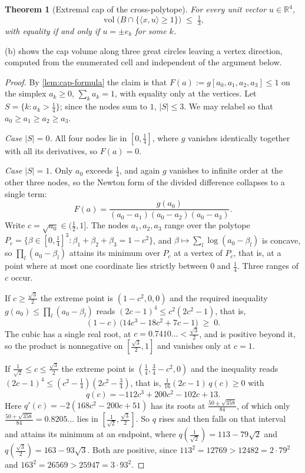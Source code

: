 \documentclass[11pt,reqno]{amsart}
\renewcommand{\_}{\origunderscore\allowbreak}
\numberwithin{equation}{section}
\theoremstyle{plain}
\newtheorem{thm}{Theorem}[section]
\theoremstyle{definition}
\theoremstyle{remark}
\DeclareMathOperator{\vol}{vol}
\begin{document}
\begin{thm}[Extremal cap of the cross-polytope]\label{thm:cap-inequality}
For every unit vector $u\in\mathbb{R}^4$,
\[
  \vol\bigl(B\cap\{\langle x,u\rangle\ge1\}\bigr)\;\le\;\tfrac13,
\]
with equality if and only if $u=\pm e_k$ for some $k$.
\end{thm}

(b) shows the cap volume along three great circles
leaving a vertex direction, computed from the enumerated cell and
independent of the argument below.

\begin{proof}
By \cref{lem:cap-formula} the claim is that $F(a):=g[a_0,a_1,a_2,a_3]\le1$
on the simplex $a_k\ge0$, $\sum_ka_k=1$, with equality only at the
vertices. Let $S=\{k:a_k>\tfrac14\}$; since the nodes sum to $1$,
$|S|\le3$. We may relabel so that $a_0\ge a_1\ge a_2\ge a_3$.

\emph{Case $|S|=0$.} All four nodes lie in $[0,\tfrac14]$, where $g$
vanishes identically together with all its derivatives, so $F(a)=0$.

\emph{Case $|S|=1$.} Only $a_0$ exceeds $\tfrac14$, and again $g$ vanishes
to infinite order at the other three nodes, so the Newton form of the
divided difference collapses to a single term:
\[
  F(a)=\frac{g(a_0)}{(a_0-a_1)(a_0-a_2)(a_0-a_3)} .
\]
Write $c=\sqrt{a_0}\in(\tfrac12,1]$. The nodes $a_1,a_2,a_3$ range over
the polytope $P_c=\{\beta\in[0,\tfrac14]^3:\beta_1+\beta_2+\beta_3=1-c^2\}$,
and $\beta\mapsto\sum_l\log(a_0-\beta_l)$ is concave, so
$\prod_l(a_0-\beta_l)$ attains its minimum over $P_c$ at a vertex of
$P_c$, that is, at a point where at most one coordinate lies strictly
between $0$ and $\tfrac14$. Three ranges of $c$ occur.

If $c\ge\tfrac{\sqrt3}{2}$ the extreme point is $(1-c^2,0,0)$ and the
required inequality $g(a_0)\le\prod_l(a_0-\beta_l)$ reads
$(2c-1)^4\le c^2(2c^2-1)$, that is,
\[
  (1-c)\,\bigl(14c^3-18c^2+7c-1\bigr)\;\ge\;0 .
\]
The cubic has a single real root, at $c=0.7410\ldots<\tfrac{\sqrt3}{2}$,
and is positive beyond it, so the product is nonnegative on
$[\tfrac{\sqrt3}{2},1]$ and vanishes only at $c=1$.

If $\tfrac{1}{\sqrt2}\le c\le\tfrac{\sqrt3}{2}$ the extreme point is
$(\tfrac14,\tfrac34-c^2,0)$ and the inequality reads
$(2c-1)^4\le(c^2-\tfrac14)(2c^2-\tfrac34)$, that is,
$\tfrac{1}{16}(2c-1)\,q(c)\ge0$ with
\[
  q(c)=-112c^3+200c^2-102c+13 .
\]
Here $q'(c)=-2(168c^2-200c+51)$ has its roots at
$\tfrac{50\pm\sqrt{358}}{84}$, of which only
$\tfrac{50+\sqrt{358}}{84}=0.8205\ldots$ lies in
$[\tfrac1{\sqrt2},\tfrac{\sqrt3}{2}]$. So $q$ rises and then falls on
that interval and attains its minimum at an endpoint, where
$q(\tfrac1{\sqrt2})=113-79\sqrt2$ and $q(\tfrac{\sqrt3}{2})=163-93\sqrt3$.
Both are positive, since $113^2=12769>12482=2\cdot79^2$ and
$163^2=26569>25947=3\cdot93^2$.


\end{proof}
\end{document}
